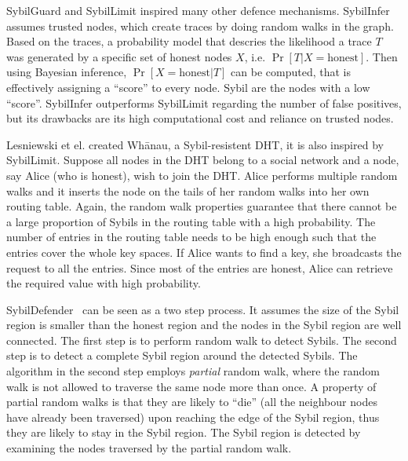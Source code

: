 SybilGuard and SybilLimit inspired many other defence mechanisms.
SybilInfer\cite{danezis2009sybilinfer} assumes trusted nodes, which create
traces by doing random walks in the graph. Based on the traces, a probability
model that descries the likelihood a trace $T$ was generated by a specific set
of honest nodes $X$, i.e. $\Pr[ T | X = \text{honest}]$. Then using Bayesian
inference, $\Pr[ X = \text{honest}| T ]$ can be computed, that is effectively
assigning a ``score'' to every node. Sybil are the nodes with a low ``score''.
SybilInfer outperforms SybilLimit regarding the number of false positives, but
its drawbacks are its high computational cost and reliance on trusted nodes.

Lesniewski et el. created Wh\={a}nau, a Sybil-resistent DHT, it is also inspired
by SybilLimit\cite{lesniewski2008sybil, lesniewski2010whanau}. Suppose all nodes
in the DHT belong to a social network and a node, say Alice (who is honest),
wish to join the DHT. Alice performs multiple random walks and it inserts the
node on the tails of her random walks into her own routing table. Again, the
random walk properties guarantee that there cannot be a large proportion of
Sybils in the routing table with a high probability. The number of entries in
the routing table needs to be high enough such that the entries cover the whole
key spaces. If Alice wants to find a key, she broadcasts the request to all the
entries. Since most of the entries are honest, Alice can retrieve the required
value with high probability.

SybilDefender~\cite{wei2012sybildefender} can be seen as a two step process. It
assumes the size of the Sybil region is smaller than the honest region and the
nodes in the Sybil region are well connected. The first step is to perform
random walk to detect Sybils. The second step is to detect a complete Sybil
region around the detected Sybils. The algorithm in the second step employs
\emph{partial} random walk, where the random walk is not allowed to traverse the
same node more than once. A property of partial random walks is that they
are likely to ``die'' (all the neighbour nodes have already been traversed) upon
reaching the edge of the Sybil region, thus they are likely to stay in the Sybil
region. The Sybil region is detected by examining the nodes traversed by the
partial random walk.


